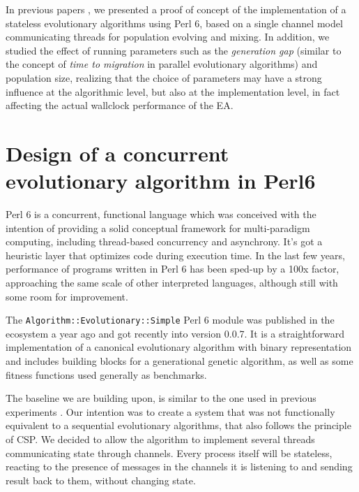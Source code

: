 \documentclass[runningheads]{llncs}\usepackage[]{graphicx}\usepackage[]{color}
\begin{document}
In previous papers 
\cite{Merelo:2018:MEA:3205651.3208317,Garcia-Valdez:2018:MEA:3205651.3205719},
we presented a proof of concept of the implementation of a stateless 
evolutionary algorithms using Perl 6, based on a single 
channel model communicating threads for population evolving and 
mixing. In addition, we studied the effect of running parameters 
such as the {\em generation gap} (similar to the concept of {\em
time to migration} in parallel evolutionary algorithms) and 
population size, realizing that the choice of parameters may have 
a strong influence at the algorithmic level, but also at the 
implementation level, in fact affecting the actual wallclock
performance of the EA.

\section{Design of a concurrent evolutionary algorithm in Perl6}
\label{sec:design}

Perl 6 is a concurrent, functional language
\cite{DBLP:journals/corr/abs-1809-01427} which was conceived with the
intention of providing a solid conceptual framework for multi-paradigm
computing, including thread-based concurrency and asynchrony. It's got
a heuristic layer that optimizes code during execution time. In the last few
years, performance of programs written in Perl 6 has been sped-up by a 100x factor, 
approaching the same scale of other interpreted
languages, although still with some room for improvement.

The {\tt Algorithm::Evolutionary::Simple} Perl 6 module was published
in the ecosystem a year ago and got recently into version 0.0.7. It
is a straightforward implementation of a canonical evolutionary
algorithm with binary representation and includes building blocks for
a generational genetic algorithm, as well as some fitness functions
used generally as benchmarks.


The baseline we are building upon, is similar to the one used in previous experiments
\cite{Merelo:2018:MEA:3205651.3208317}. Our intention was to
create a system that was not functionally equivalent to a sequential
evolutionary algorithms, that also follows the principle of
CSP. We decided to allow the algorithm to implement several threads communicating state through
channels. Every process itself will be stateless, reacting to the
presence of messages in the channels it is listening to and sending
result back to them, without changing state.
\end{document}
